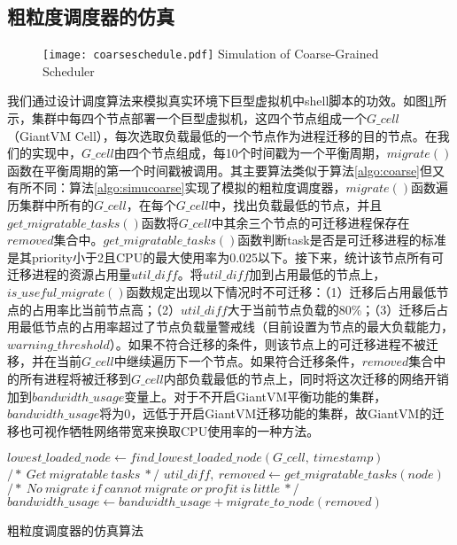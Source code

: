 \subsection{粗粒度调度器的仿真}
\begin{figure}[!htp]
  \centering
  \texttt{[image: coarseschedule.pdf]}
    {Simulation of Coarse-Grained Scheduler}
  \label{fig:simucoarse}
\end{figure}
我们通过设计调度算法来模拟真实环境下巨型虚拟机中shell脚本的功效。如图\ref{fig:simucoarse}所示，集群中每四个节点部署一个巨型虚拟机，这四个节点组成一个$G\_cell$（GiantVM Cell），每次选取负载最低的一个节点作为进程迁移的目的节点。在我们的实现中，$G\_cell$由四个节点组成，每10个时间戳为一个平衡周期，$migrate()$函数在平衡周期的第一个时间戳被调用。其主要算法类似于算法\ref{algo:coarse}但又有所不同：算法\ref{algo:simucoarse}实现了模拟的粗粒度调度器，$migrate()$函数遍历集群中所有的$G\_cell$，在每个$G\_cell$中，找出负载最低的节点，并且$get\_migratable\_tasks()$函数将$G\_cell$中其余三个节点的可迁移进程保存在$removed$集合中。$get\_migratable\_tasks()$函数判断task是否是可迁移进程的标准是其priority小于2且CPU的最大使用率为0.025以下。接下来，统计该节点所有可迁移进程的资源占用量$util\_diff$。将$util\_diff$加到占用最低的节点上，$is\_useful\_migrate()$函数规定出现以下情况时不可迁移：（1）迁移后占用最低节点的占用率比当前节点高；（2）$util\_diff$大于当前节点负载的80\%；（3）迁移后占用最低节点的占用率超过了节点负载量警戒线（目前设置为节点的最大负载能力，$warning\_threshold$）。如果不符合迁移的条件，则该节点上的可迁移进程不被迁移，并在当前$G\_cell$中继续遍历下一个节点。如果符合迁移条件，$removed$集合中的所有进程将被迁移到$G\_cell$内部负载最低的节点上，同时将这次迁移的网络开销加到$bandwidth\_usage$变量上。对于不开启GiantVM平衡功能的集群，$bandwidth\_usage$将为0，远低于开启GiantVM迁移功能的集群，故GiantVM的迁移也可视作牺牲网络带宽来换取CPU使用率的一种方法。

\begin{algorithm}[h]
\begin{algorithmic}[1]
\State $lowest\_loaded\_node \gets find\_lowest\_loaded\_node(G\_cell,\  timestamp)$
\State
{}
\State $/*\ Get\ migratable\ tasks\ */$
\State $util\_diff,\  removed \gets get\_migratable\_tasks(node)$
\State
\State $/*\ No\ migrate\ if\ cannot\ migrate\ or\ profit\ is\ little\ */$
\State $bandwidth\_usage \gets bandwidth\_usage + migrate\_to\_node(removed)$
\EndIf
\EndFor
\EndFor
\end{algorithmic}
\caption{粗粒度调度器的仿真算法}
\label{algo:simucoarse}
\end{algorithm}

